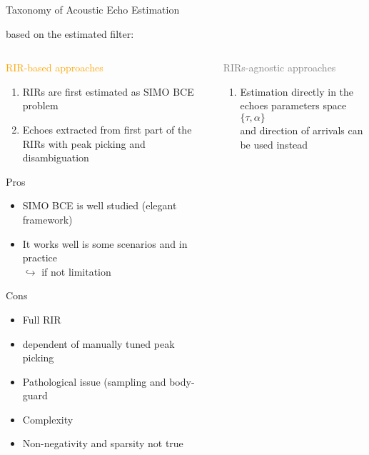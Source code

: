 \begin{frame}{Taxonomy of Acoustic Echo Estimation}

    \begin{block}{\mytriag based on the estimated filter:}
        \vspace{1em}
        \small
        \begin{columns}[T,onlytextwidth] %
            \begin{column}{.48\textwidth}
                \textcolor{orange}{RIR-based approaches}
                \begin{enumerate}
                    \item RIRs are first estimated as SIMO BCE problem
                    \item Echoes extracted from first part of the RIRs with peak picking and disambiguation
                \end{enumerate}
                Pros
                \begin{itemize}
                    \item SIMO BCE is well studied (elegant framework)
                    \item It works well is some scenarios and in practice
                    \\$\hookrightarrow$ if not limitation
                \end{itemize}
                Cons
                \begin{itemize}
                    \item Full RIR
                    \item dependent of manually tuned peak picking
                    \item Pathological issue (sampling and body-guard
                    \item Complexity
                    \item Non-negativity and sparsity not true
                \end{itemize}
            \end{column}%
            \hfill%
            \begin{column}{.48\textwidth}
                \textcolor{gray}{RIRs-agnostic approaches}
                \begin{enumerate}
                    \item Estimation directly in the echoes parameters space $\{\tau,\alpha\}$
                    \\and direction of arrivals can be used instead

\end{enumerate}
\end{column}
\end{columns}
\end{block}
\end{frame}
